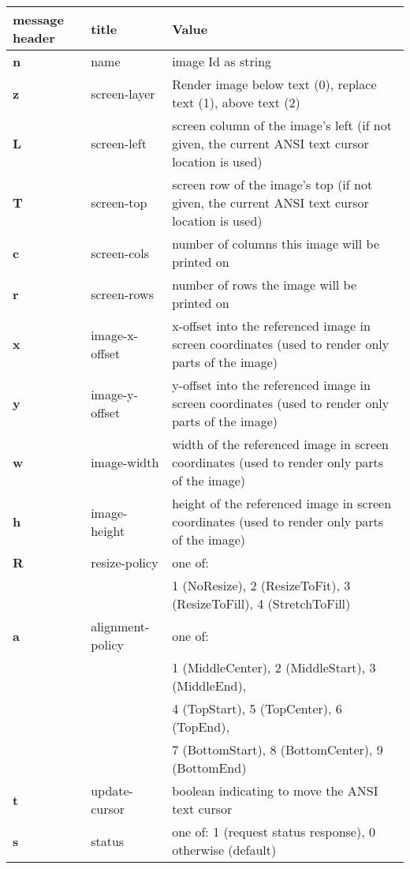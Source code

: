 \documentclass[a4paper]{article}
\begin{document}
\begin{tabular}{|m{3cm}|m{2cm}|m{11cm}|}
    \hline
    \textbf{message header}   & \textbf{title}   & \textbf{Value} \\
    \hline
    \textbf{n} & name             & image Id as string \\
    \textbf{z} & screen-layer     & Render image below text (0), replace text (1), above text (2) \\
    \textbf{L} & screen-left      & screen column of the image's left (if not given, the current ANSI text cursor location is used) \\
    \textbf{T} & screen-top       & screen row of the image's top (if not given, the current ANSI text cursor location is used) \\
    \textbf{c} & screen-cols      & number of columns this image will be printed on \\
    \textbf{r} & screen-rows      & number of rows the image will be printed on \\
    \textbf{x} & image-x-offset   & x-offset into the referenced image in screen coordinates (used to render only parts of the image) \\
    \textbf{y} & image-y-offset   & y-offset into the referenced image in screen coordinates (used to render only parts of the image) \\
    \textbf{w} & image-width      & width of the referenced image in screen coordinates (used to render only parts of the image) \\
    \textbf{h} & image-height     & height of the referenced image in screen coordinates (used to render only parts of the image) \\
    \textbf{R} & resize-policy    & one of: \\ %
               &                  & 1 (NoResize), 2 (ResizeToFit), 3 (ResizeToFill), 4 (StretchToFill) \\
    \textbf{a} & alignment-policy & one of: \\
               &                  & 1 (MiddleCenter), 2 (MiddleStart), 3 (MiddleEnd), \\
               &                  & 4 (TopStart), 5 (TopCenter), 6 (TopEnd), \\
               &                  & 7 (BottomStart), 8 (BottomCenter), 9 (BottomEnd) \\
    \textbf{t} & update-cursor    & boolean indicating to move the ANSI text cursor \\
    \textbf{s} & status           & one of: 1 (request status response), 0 otherwise (default) \\
    \hline
\end{tabular}
\end{document}
